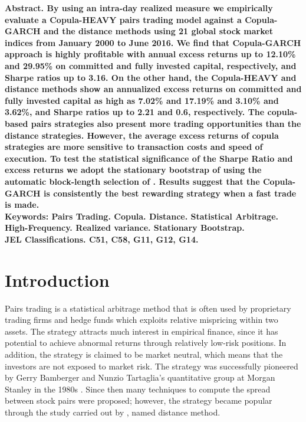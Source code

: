 \documentclass[a4paper,12pt]{report}
\begin{document}

\begin{refsection}
\renewcommand{\thetable}{\arabic{table}}

\setlength{\baselineskip}{12pt}
\noindent\bf Abstract. \rm By using an intra-day realized measure we empirically evaluate a Copula-HEAVY pairs trading model against a Copula-GARCH and the distance methods using 21 global stock market indices from January 2000 to June 2016. We find that Copula-GARCH approach is highly profitable with annual excess returns up to 12.10\% and 29.95\% on committed and fully invested capital, respectively, and Sharpe ratios up to 3.16. On the other hand, the Copula-HEAVY and distance methods show an annualized excess returns on committed and fully invested capital as high as 7.02\% and 17.19\% and 3.10\% and 3.62\%, and Sharpe ratios up to 2.21 and 0.6, respectively. The copula-based pairs strategies also present more trading opportunities than the distance strategies. However, the average excess returns of copula strategies are more sensitive to transaction costs and speed of execution. To test the statistical significance of the Sharpe Ratio and excess returns we adopt the stationary bootstrap of \citet*{pr94} using the automatic block-length selection of \citet*{pw04}. Results suggest that the Copula-GARCH is consistently the best rewarding strategy when a fast trade is made.\\[.1in]

\noindent \bf Keywords: \rm Pairs Trading. Copula. Distance. Statistical Arbitrage. High-Frequency. Realized variance. Stationary Bootstrap. \\[.1in]
\noindent \bf JEL Classifications. \rm  C51, C58, G11, G12, G14.
\clearpage

\setlength{\baselineskip}{12pt}
\setcounter{footnote}{0}
\clearpage
\section{Introduction}
\label{introduction}

Pairs trading is a statistical arbitrage method that is often used by proprietary trading firms and hedge funds which exploits relative mispricing within two assets. The strategy attracts much interest in empirical finance, since it has potential to achieve abnormal returns through relatively low-risk positions. In addition, the strategy is claimed to be market neutral, which means that the investors are not exposed to market risk. The strategy was successfully pioneered by Gerry Bamberger and  Nunzio Tartaglia's quantitative group at Morgan Stanley in the 1980s \citet*{ggr06}. Since then many techniques to compute the spread between stock pairs were proposed; however, the strategy became popular through the study carried out by \citet*{ggr06}, named distance method.


\end{refsection}
\end{document}
